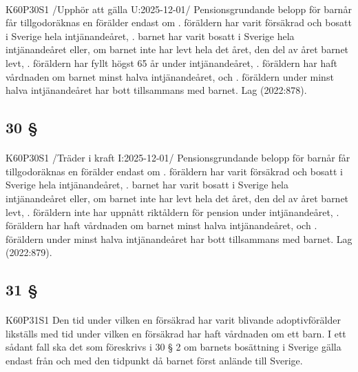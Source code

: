 \documentclass[a4paper,notitlepage,openany,10pt]{book}
\begin{document}
\paragraph*{}
{\tiny K60P30S1}
/Upphör att gälla U:2025-12-01/
Pensionsgrundande belopp för barnår får tillgodoräknas en förälder endast om
. föräldern har varit försäkrad och bosatt i Sverige hela intjänandeåret,
. barnet har varit bosatt i Sverige hela intjänandeåret eller, om barnet inte har levt hela det året, den del av året barnet levt,
. föräldern har fyllt högst 65 år under intjänandeåret,
. föräldern har haft vårdnaden om barnet minst halva intjänandeåret, och
. föräldern under minst halva intjänandeåret har bott tillsammans med barnet.
Lag (2022:878).
\subsection*{30 §}
\paragraph*{}
{\tiny K60P30S1}
/Träder i kraft I:2025-12-01/
Pensionsgrundande belopp för barnår får tillgodoräknas en förälder endast om
. föräldern har varit försäkrad och bosatt i Sverige hela intjänandeåret,
. barnet har varit bosatt i Sverige hela intjänandeåret eller, om barnet inte har levt hela det året, den del av året barnet levt,
. föräldern inte har uppnått riktåldern för pension under intjänandeåret,
. föräldern har haft vårdnaden om barnet minst halva intjänandeåret, och
. föräldern under minst halva intjänandeåret har bott tillsammans med barnet.
Lag (2022:879).
\subsection*{31 §}
\paragraph*{}
{\tiny K60P31S1}
Den tid under vilken en försäkrad har varit blivande adoptivförälder likställs med tid under vilken en försäkrad har haft vårdnaden om ett barn. I ett sådant fall ska det som föreskrivs i 30 § 2 om barnets bosättning i Sverige gälla endast från och med den tidpunkt då barnet först anlände till Sverige.
\end{document}
